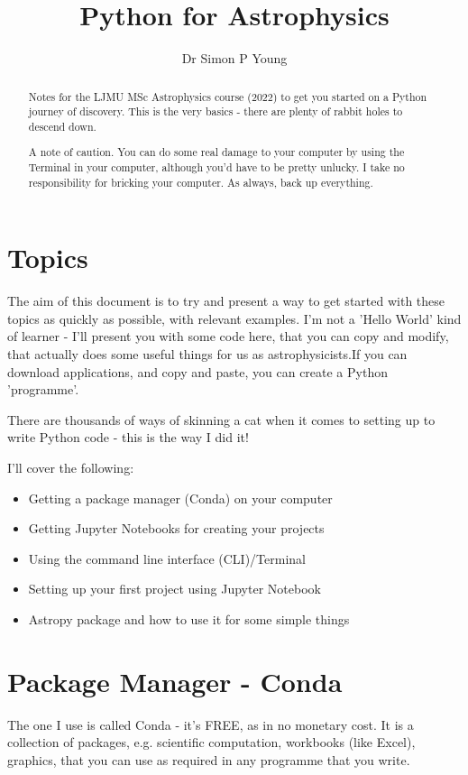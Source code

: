 \documentclass{article}
\title{Python for Astrophysics}
\author{Dr Simon P Young}
\begin{document}
\maketitle

\begin{abstract}
Notes for the LJMU MSc Astrophysics course (2022) to get you started on a Python journey of discovery. This is the very basics - there are plenty of rabbit holes to descend down. 

A note of caution. You can do some real damage to your computer by using the Terminal in your computer, although you'd have to be pretty unlucky. I take no responsibility for bricking your computer. As always, back up everything. 
\end{abstract}

\tableofcontents

\newpage

\section{Topics}
The aim of this document is to try and present a way to get started with these topics as quickly as possible, with relevant examples. I'm not a 'Hello World' kind of learner - I'll present you with some code here, that you can copy and modify, that actually does some useful things for us as astrophysicists.If you can download applications, and copy and paste, you can create a Python 'programme'. 

There are thousands of ways of skinning a cat when it comes to setting up to write Python code - this is the way I did it!

I'll cover the following:
\begin{itemize}
\item Getting a package manager (Conda) on your computer
\item Getting Jupyter Notebooks for creating your projects
\item Using the command line interface (CLI)/Terminal
\item Setting up your first project using Jupyter Notebook
\item Astropy package and how to use it for some simple things

\end{itemize}

\section{Package Manager - Conda}
The one I use is called Conda - it's FREE, as in no monetary cost. It is a collection of packages, e.g. scientific computation, workbooks (like Excel), graphics, that you can use as required in any programme that you write. 
\end{document}
